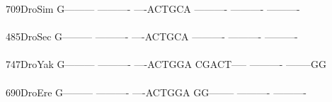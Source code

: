 \documentclass[11pt,twoside,reqno,a4paper]{article}
\begin{document}
{709\hspace*{2\charwidth}DroSim	G---------	----------	----ACTGCA	----------	----------	----------	\\
\hspace*{5\charwidth}\hspace*{7\charwidth}\hspace*{1\charwidth}\hspace*{1\charwidth}\hspace*{1\charwidth}\hspace*{1\charwidth}\hspace*{1\charwidth}\hspace*{1\charwidth}\\
485\hspace*{2\charwidth}DroSec	G---------	----------	----ACTGCA	----------	----------	----------	\\
\hspace*{5\charwidth}\hspace*{7\charwidth}\hspace*{1\charwidth}\hspace*{1\charwidth}\hspace*{1\charwidth}\hspace*{1\charwidth}\hspace*{1\charwidth}\hspace*{1\charwidth}\\
747\hspace*{2\charwidth}DroYak	G---------	----------	----ACTGGA	CGACT-----	----------	--------GG	\\
\hspace*{5\charwidth}\hspace*{7\charwidth}\hspace*{1\charwidth}\hspace*{1\charwidth}\hspace*{1\charwidth}\hspace*{1\charwidth}\hspace*{1\charwidth}\hspace*{1\charwidth}\\
690\hspace*{2\charwidth}DroEre	G---------	----------	----ACTGGA	GG--------	----------	----------	\\
\hspace*{5\charwidth}\hspace*{7\charwidth}\hspace*{1\charwidth}\hspace*{1\charwidth}\hspace*{1\charwidth}\hspace*{1\charwidth}\hspace*{1\charwidth}\hspace*{1\charwidth}\\
}
\end{document}

